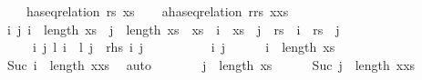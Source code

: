 \begin{isabellebody}
\ \ \ \ has{\isacharunderscore}{\kern0pt}eq{\isacharunderscore}{\kern0pt}relation\ rs\ xs{\isacharparenright}{\kern0pt}{\isachardoublequoteclose}\isanewline
%
\isadelimproof
%
\endisadelimproof
%
\isatagproof
{}\isamarkupfalse%
\isanewline
\ \ \isamarkupfalse%
\ a{\isacharcolon}{\kern0pt}{\isachardoublequoteopen}has{\isacharunderscore}{\kern0pt}eq{\isacharunderscore}{\kern0pt}relation\ {\isacharparenleft}{\kern0pt}r{\isacharhash}{\kern0pt}rs{\isacharparenright}{\kern0pt}\ {\isacharparenleft}{\kern0pt}x{\isacharhash}{\kern0pt}xs{\isacharparenright}{\kern0pt}{\isachardoublequoteclose}\isanewline
\ \ \isamarkupfalse%
\ {\isachardoublequoteopen}{\isasymAnd}i\ j{\isachardot}{\kern0pt}\ i\ {\isacharless}{\kern0pt}\ length\ xs\ {\isasymLongrightarrow}\ j\ {\isacharless}{\kern0pt}\ length\ xs\ {\isasymLongrightarrow}\ {\isacharparenleft}{\kern0pt}xs\ {\isacharbang}{\kern0pt}\ i\ {\isacharequal}{\kern0pt}\ xs\ {\isacharbang}{\kern0pt}\ j{\isacharparenright}{\kern0pt}\ {\isacharequal}{\kern0pt}\ {\isacharparenleft}{\kern0pt}rs\ {\isacharbang}{\kern0pt}\ i\ {\isacharequal}{\kern0pt}\ rs\ {\isacharbang}{\kern0pt}\ j{\isacharparenright}{\kern0pt}{\isachardoublequoteclose}\isanewline
\ \ \ \ {\isacharparenleft}{\kern0pt}\ {\isachardoublequoteopen}{\isasymAnd}i\ j{\isachardot}{\kern0pt}\ {\isacharquery}{\kern0pt}l{}\ i\ {\isasymLongrightarrow}\ {\isacharquery}{\kern0pt}l{}\ j\ {\isasymLongrightarrow}\ {\isacharquery}{\kern0pt}rhs\ i\ j{\isachardoublequoteclose}{\isacharparenright}{\kern0pt}\isanewline
\ \ \isamarkupfalse%
\ {\isacharminus}{\kern0pt}\isanewline
\ \ \ \ \isamarkupfalse%
\ i\ j\isanewline
\ \ \ \ \isamarkupfalse%
\ {\isachardoublequoteopen}i\ {\isacharless}{\kern0pt}\ length\ xs{\isachardoublequoteclose}\isanewline
\ \ \ \ \isamarkupfalse%
\ {\isachardoublequoteopen}Suc\ i\ {\isacharless}{\kern0pt}\ length\ {\isacharparenleft}{\kern0pt}x{\isacharhash}{\kern0pt}xs{\isacharparenright}{\kern0pt}{\isachardoublequoteclose}\ \isamarkupfalse%
\ auto\isanewline
\ \ \ \ \isamarkupfalse%
\ \isamarkupfalse%
\ {\isachardoublequoteopen}j\ {\isacharless}{\kern0pt}\ length\ xs{\isachardoublequoteclose}\isanewline
\ \ \ \ \isamarkupfalse%
\ {\isachardoublequoteopen}Suc\ j\ {\isacharless}{\kern0pt}\ length\ {\isacharparenleft}{\kern0pt}x{\isacharhash}{\kern0pt}xs{\isacharparenright}{\kern0pt}{\isachardoublequoteclose}\ \isamarkupfalse%

\end{isabellebody}
